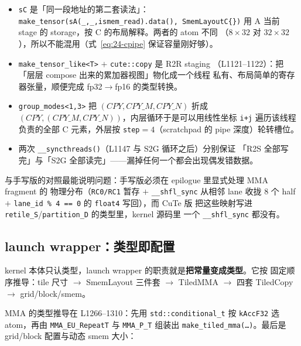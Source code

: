 \begin{itemize}
  \item \texttt{sC} 是「同一段地址的第二套读法」：
        \texttt{make\_\allowbreak{}tensor\allowbreak{}(s\allowbreak{}A\allowbreak{}(\_\allowbreak{},\allowbreak{}\_\allowbreak{},\allowbreak{}ismem\_\allowbreak{}read).\allowbreak{}data\allowbreak{}(),\allowbreak{} Smem\allowbreak{}Layout\allowbreak{}C\{\})}
        用 A 当前 stage 的 storage，按 C 的布局解释。两者的 atom 不同
        （$8\times32$ 对 $32\times32$），所以不能混用（式~\eqref{eq:24-cpipe}
        保证容量刚好够）。
  \item \texttt{make\_\allowbreak{}tensor\_\allowbreak{}like\allowbreak{}<T>} $+$ \texttt{cute::copy} 是 R2R staging
        （L1121--1122）：把「层层 compose 出来的累加器视图」物化成一个线程
        私有、布局简单的寄存器张量，顺便完成 fp32$\to$fp16 的类型转换。
  \item \texttt{group\_\allowbreak{}modes\allowbreak{}<1,\allowbreak{}3>} 把 $(CPY, CPY\_M, CPY\_N)$ 折成
        $(CPY, (CPY\_M, CPY\_N))$，内层循环于是可以用线性坐标 \texttt{i+j}
        遍历该线程负责的全部 C 元素，外层按 \texttt{step}$=4$（scratchpad 的
        pipe 深度）轮转槽位。
  \item 两次 \texttt{\_\allowbreak{}\_\allowbreak{}syncthreads\allowbreak{}()}（L1147 与 S2G 循环之后）分别保证
        「R2S 全部写完」与「S2G 全部读完」——漏掉任何一个都会出现偶发错数据。
\end{itemize}

与手写版的对照最能说明问题：手写版必须在 epilogue 里显式处理 MMA fragment 的
物理分布（\texttt{RC0/RC1} 暂存 $+$ \texttt{\_\_shfl\_sync} 从相邻 lane 收拢
8 个 half $+$ \texttt{lane\_id \% 4 == 0} 的 \texttt{float4} 写回），而 CuTe 版
把这些映射写进 \texttt{retile\_S}/\texttt{partition\_D} 的类型里，kernel 源码里
一个 \texttt{\_\_shfl\_sync} 都没有。

\subsection{launch wrapper：类型即配置}

kernel 本体只认类型，launch wrapper 的职责就是\textbf{把常量变成类型}。它按
固定顺序推导：tile 尺寸 $\to$ SmemLayout 三件套 $\to$ TiledMMA $\to$ 四套
TiledCopy $\to$ grid/block/smem。



MMA 的类型推导在 L1266--1310：先用 \texttt{std::\allowbreak{}conditional\_\allowbreak{}t} 按
\texttt{kAccF32} 选 atom，再由 \texttt{MMA\_\allowbreak{}EU\_\allowbreak{}Repeat\allowbreak{}T} 与
\texttt{MMA\_P\_T} 组装出 \texttt{make\_\allowbreak{}tiled\_\allowbreak{}mma\allowbreak{}(\dots)}。最后是
grid/block 配置与动态 smem 大小：

